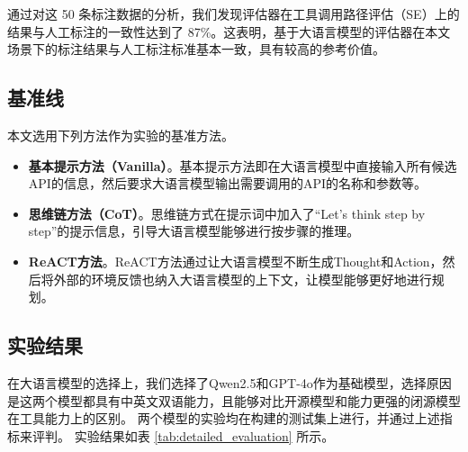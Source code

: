 通过对这 50 条标注数据的分析，我们发现评估器在工具调用路径评估（SE）上的结果与人工标注的一致性达到了 87\%。这表明，基于大语言模型的评估器在本文场景下的标注结果与人工标注标准基本一致，具有较高的参考价值。

\subsection{基准线}

本文选用下列方法作为实验的基准方法。

\begin{itemize}
  \item  \textbf{基本提示方法（Vanilla）}。基本提示方法即在大语言模型中直接输入所有候选API的信息，然后要求大语言模型输出需要调用的API的名称和参数等。
  \item  \textbf{思维链方法（CoT）}\cite{Wang2023a}。思维链方式在提示词中加入了“Let's think step by step”的提示信息，引导大语言模型能够进行按步骤的推理。
  \item  \textbf{ReACT方法}\cite{Yao2023b}。ReACT方法通过让大语言模型不断生成Thought和Action，然后将外部的环境反馈也纳入大语言模型的上下文，让模型能够更好地进行规划。
\end{itemize}
\indent

\subsection{实验结果}

在大语言模型的选择上，我们选择了Qwen2.5和GPT-4o作为基础模型，选择原因是这两个模型都具有中英文双语能力，且能够对比开源模型和能力更强的闭源模型在工具能力上的区别。
两个模型的实验均在构建的测试集上进行，并通过上述指标来评判。
实验结果如表 \ref{tab:detailed_evaluation} 所示。

